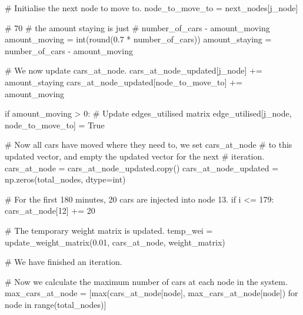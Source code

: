 \documentclass[paper=a4, fontsize=12pt]{scrartcl} %
\numberwithin{equation}{section}       %
\numberwithin{figure}{section}         %
\numberwithin{table}{section}          %
\begin{document}
\begin{python}
                # Initialise the next node to move to.
                node_to_move_to = next_nodes[j_node]

                # 70%
                # the amount staying is just 
                # number_of_cars - amount_moving
                amount_moving = int(round(0.7 * number_of_cars))
                amount_staying = number_of_cars - amount_moving

                # We now update cars_at_node.
                cars_at_node_updated[j_node] += amount_staying
                cars_at_node_updated[node_to_move_to] += amount_moving

                if amount_moving > 0:
                    # Update edges_utilised matrix
                    edge_utilised[j_node, node_to_move_to] = True

        # Now all cars have moved where they need to, we set cars_at_node
        # to this updated vector, and empty the updated vector for the next
        # iteration.
        cars_at_node = cars_at_node_updated.copy()
        cars_at_node_updated = np.zeros(total_nodes, dtype=int)

        # For the first 180 minutes, 20 cars are injected into node 13.
        if i <= 179:
            cars_at_node[12] += 20

        # The temporary weight matrix is updated.
        temp_wei = update_weight_matrix(0.01, cars_at_node, weight_matrix)

        # We have finished an iteration.

       # Now we calculate the maximum number of cars at each node in the system.
        max_cars_at_node = [max(cars_at_node[node], max_cars_at_node[node]) 
                            for node in range(total_nodes)]
\end{python}
\end{document}
